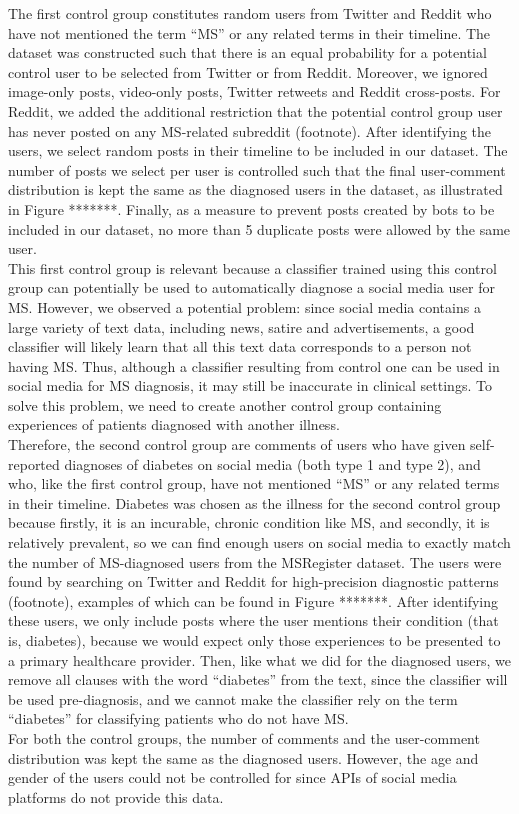 \documentclass[11pt,a4paper]{article}
\begin{document}
\indent The first control group constitutes random users from Twitter and Reddit who have not mentioned the term “MS” or any related terms in their timeline. The dataset was constructed such that there is an equal probability for a potential control user to be selected from Twitter or from Reddit. Moreover, we ignored image-only posts, video-only posts, Twitter retweets and Reddit cross-posts. For Reddit, we added the additional restriction that the potential control group user has never posted on any MS-related subreddit (footnote). After identifying the users, we select random posts in their timeline to be included in our dataset. The number of posts we select per user is controlled such that the final user-comment distribution is kept the same as the diagnosed users in the dataset, as illustrated in Figure *******. Finally, as a measure to prevent posts created by bots to be included in our dataset, no more than 5 duplicate posts were allowed by the same user. \\
\indent This first control group is relevant because a classifier trained using this control group can potentially be used to automatically diagnose a social media user for MS. However, we observed a potential problem: since social media contains a large variety of text data, including news, satire and advertisements, a good classifier will likely learn that all this text data corresponds to a person not having MS. Thus, although a classifier resulting from control one can be used in social media for MS diagnosis, it may still be inaccurate in clinical settings. To solve this problem, we need to create another control group containing experiences of patients diagnosed with another illness. \\
\indent Therefore, the second control group are comments of users who have given self-reported diagnoses of diabetes on social media (both type 1 and type 2), and who, like the first control group, have not mentioned “MS” or any related terms in their timeline. Diabetes was chosen as the illness for the second control group because firstly, it is an incurable, chronic condition like MS, and secondly, it is relatively prevalent, so we can find enough users on social media to exactly match the number of MS-diagnosed users from the MSRegister dataset. The users were found by searching on Twitter and Reddit for high-precision diagnostic patterns (footnote), examples of which can be found in Figure *******. After identifying these users, we only include posts where the user mentions their condition (that is, diabetes), because we would expect only those experiences to be presented to a primary healthcare provider. Then, like what we did for the diagnosed users, we remove all clauses with the word “diabetes” from the text, since the classifier will be used pre-diagnosis, and we cannot make the classifier rely on the term “diabetes” for classifying patients who do not have MS. \\
\indent For both the control groups, the number of comments and the user-comment distribution was kept the same as the diagnosed users. However, the age and gender of the users could not be controlled for since APIs of social media platforms do not provide this data.
\end{document}
